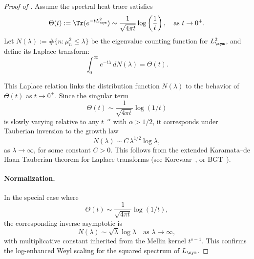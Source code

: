 \begin{proof}[Proof of ]
Assume the spectral heat trace satisfies
\[
\Theta(t) := \Tr(e^{-t L_{\sym}^2}) \sim \frac{1}{\sqrt{4\pi t}} \log\left( \frac{1}{t} \right), \quad \text{as } t \to 0^+.
\]
Let \( N(\lambda) := \#\{ n : \mu_n^2 \le \lambda \} \) be the eigenvalue counting function for \( L_{\sym}^2 \), and define its Laplace transform:
\[
\int_0^\infty e^{-t \lambda} \, dN(\lambda) = \Theta(t).
\]

This Laplace relation links the distribution function \( N(\lambda) \) to the behavior of \( \Theta(t) \) as \( t \to 0^+ \). Since the singular term
\[
\Theta(t) \sim \frac{1}{\sqrt{4\pi t}} \log(1/t)
\]
is slowly varying relative to any \( t^{-\alpha} \) with \( \alpha > 1/2 \), it corresponds under Tauberian inversion to the growth law
\[
N(\lambda) \sim C \, \lambda^{1/2} \log \lambda,
\]
as \( \lambda \to \infty \), for some constant \( C > 0 \). This follows from the extended Karamata–de Haan Tauberian theorem for Laplace transforms (see Korevaar~\cite[Thm.~4.12.9]{Korevaar2004Tauberian}, or BGT~\cite[Thm.~1.7.1]{BGT1989RegularVariation}).

\paragraph{Normalization.}
In the special case where
\[
\Theta(t) \sim \frac{1}{\sqrt{4\pi t}} \log(1/t),
\]
the corresponding inverse asymptotic is
\[
N(\lambda) \sim \sqrt{\lambda} \log \lambda \quad \text{as } \lambda \to \infty,
\]
with multiplicative constant inherited from the Mellin kernel \( t^{s - 1} \). This confirms the log-enhanced Weyl scaling for the squared spectrum of \( L_{\sym} \).

\end{proof}
